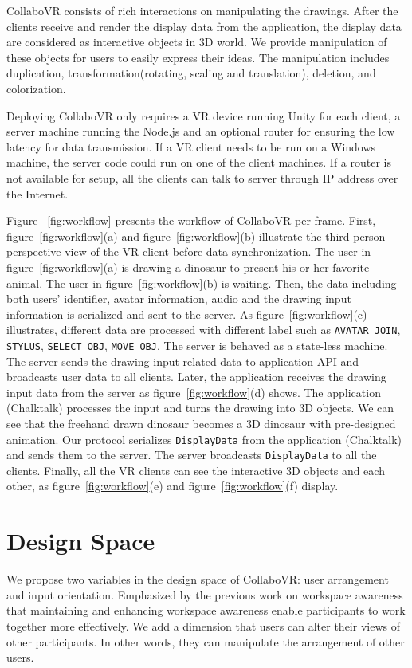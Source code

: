 \documentclass{sigchi}
\begin{document}
CollaboVR consists of rich interactions on manipulating the drawings. After the clients receive and render the display data from the application, the display data are considered as interactive objects in 3D world. We provide manipulation of these objects for users to easily express their ideas. The manipulation includes duplication, transformation(rotating, scaling and translation), deletion, and colorization.

Deploying CollaboVR only requires a VR device running Unity for each client, a server machine running the Node.js and an optional router for ensuring the low latency for data transmission. If a VR client needs to be run on a Windows machine, the server code could run on one of the client machines. If a router is not available for setup, all the clients can talk to server through IP address over the Internet. 


Figure ~\ref{fig:workflow} presents the workflow of CollaboVR per frame. First, figure~\ref{fig:workflow}(a) and figure~\ref{fig:workflow}(b) illustrate the third-person perspective view of the VR client before data synchronization. The user in figure~\ref{fig:workflow}(a) is drawing a dinosaur to present his or her favorite animal. The user in figure~\ref{fig:workflow}(b) is waiting. Then, the data including both users' identifier, avatar information, audio and the drawing input information is serialized and sent to the server. As figure~\ref{fig:workflow}(c) illustrates, different data are processed with different label such as \verb|AVATAR_JOIN|, \verb|STYLUS|, \verb|SELECT_OBJ|, \verb|MOVE_OBJ|. The server is behaved as a state-less machine. The server sends the drawing input related data to application API and broadcasts user data to all clients. Later, the application receives the drawing input data from the server as figure~\ref{fig:workflow}(d) shows. The application (Chalktalk) processes the input and turns the drawing into 3D objects. We can see that the freehand drawn dinosaur becomes a 3D dinosaur with pre-designed animation. Our protocol serializes \verb|DisplayData| from the application (Chalktalk) and sends them to the server. The server broadcasts \verb|DisplayData| to all the clients. Finally, all the VR clients can see the interactive 3D objects and each other, as figure~\ref{fig:workflow}(e) and figure~\ref{fig:workflow}(f) display.

\section{Design Space}
We propose two variables in the design space of CollaboVR: user arrangement and input orientation. Emphasized by the previous work on workspace awareness that maintaining and enhancing workspace awareness enable participants to work together more effectively. We add a dimension that users can alter their views of other participants. In other words, they can manipulate the arrangement of other users. 
\end{document}

